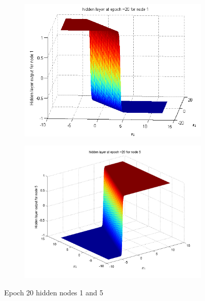 \documentclass{article}
\begin{document}
\begin{figure}
\begin{subfigure}{.5\textwidth}
  \centering
  \includegraphics[width=.8\linewidth]{Classification/overlapping/h20_1}
 
\end{subfigure}%
\begin{subfigure}{.5\textwidth}
  \centering
  \includegraphics[width=.8\linewidth]{Classification/overlapping/h20_5}
  \end{subfigure}
\caption{Epoch 20 hidden nodes 1 and 5}
\end{figure}
\end{document}
